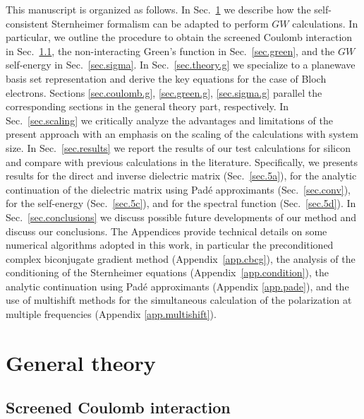 \documentclass[twocolumn,prb,showpacs,superscriptaddress]{revtex4}
\begin{document}
This manuscript is organized as follows. In Sec.\ \ref{sec.theory} we describe
how the self-consistent Sternheimer formalism can be adapted to perform $GW$ calculations.
In particular, we outline the procedure to obtain the screened Coulomb
interaction in Sec.\ \ref{sec.coulomb}, the non-interacting Green's function
in Sec.\ \ref{sec.green}, and the $GW$ self-energy in Sec.\ \ref{sec.sigma}.
In Sec.~\ref{sec.theory.g} we specialize to a planewave basis set representation
and derive the key equations for the case of Bloch electrons.
Sections \ref{sec.coulomb.g}, \ref{sec.green.g}, \ref{sec.sigma.g}
parallel the corresponding sections in the general theory part, respectively.
In Sec.\ \ref{sec.scaling} we critically analyze the advantages 
and limitations of the present approach with an emphasis on the
scaling of the calculations with system size. 
In Sec.\ \ref{sec.results} we report the results of our test calculations
for silicon and compare with previous calculations in the literature. Specifically,
we presents results for the direct and inverse dielectric matrix (Sec.\ \ref{sec.5a}),
for the analytic continuation of the dielectric matrix using Pad\'e approximants
(Sec.\ \ref{sec.conv}), for the self-energy (Sec.\ \ref{sec.5c}), 
and for the spectral function (Sec.\ \ref{sec.5d}).
In Sec.~\ref{sec.conclusions} we discuss possible
future developments of our method and discuss our conclusions.
The Appendices provide technical details on some numerical algorithms adopted
in this work, in particular the preconditioned complex biconjugate gradient method (Appendix~\ref{app.cbcg}),
the analysis of the conditioning of the Sternheimer equations (Appendix~\ref{app.condition}),
the analytic continuation using Pad\'e approximants (Appendix \ref{app.pade}),
and the use of multishift methods for the simultaneous calculation of 
the polarization at multiple frequencies (Appendix \ref{app.multishift}).

\section{General theory}\label{sec.theory}

\subsection{Screened Coulomb interaction}\label{sec.coulomb}
\end{document}
